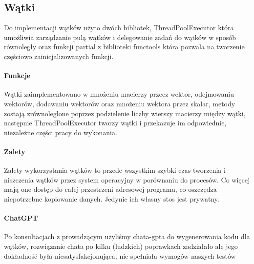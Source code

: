 \subsection{Wątki}
Do implementacji wątków użyto dwóch bibliotek, ThreadPoolExecutor która umożliwia zarządzanie pulą wątków i delegowanie zadań do wątków 
w sposób równoległy oraz funkcji partial z biblioteki functools która pozwala na tworzenie częściowo zainicjalizowanych funkcji.
\paragraph{Funkcje}
Wątki zaimplementowano w mnożeniu macierzy przeez wektor, odejmowaniu wektorów, dodawaniu wektorów oraz mnożeniu wektora przez skalar, metody zostają
zrównoleglone poprzez podzielenie liczby wierszy macierzy między wątki, następnie ThreadPoolExecutor tworzy wątki i przekazuje im odpowiednie, niezależne 
części pracy do wykonania.
\paragraph{Zalety}
Zalety wykorzystania wątków to przede wszystkim szybki czas tworzenia i niszczenia wątków przez system operacyjny w porównaniu do procesów. 
Co więcej mają one dostęp do całej przestrzeni adresowej programu, co oszczędza niepotrzebne kopiowanie danych. Jedynie ich własny stos jest prywatny. 

\paragraph{ChatGPT}
Po konsultacjach z prowadzącym użyliśmy chata-gpta do wygenerowania kodu dla wątków, rozwiązanie chata po kilku (ludzkich) poprawkach zadziałało ale jego dokładność była niesatysfakcjonująca,
nie spełniała wymogów naszych testów

